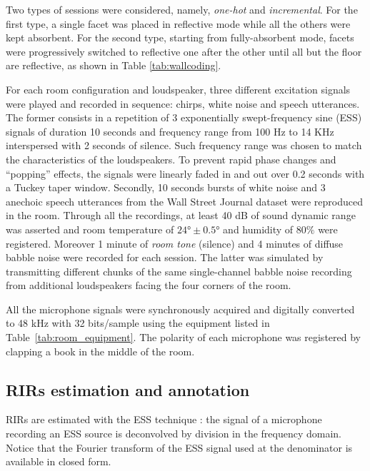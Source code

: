 Two types of sessions were considered, namely, \textit{one-hot} and \textit{incremental}. For the first type, a single facet was placed in reflective mode while all the others were kept absorbent. For the second type, starting from fully-absorbent mode, facets were progressively switched to reflective one after the other until all but the floor are reflective, as shown in Table \ref{tab:wallcoding}.




For each room configuration and loudspeaker, three different excitation signals were played and recorded in sequence: chirps, white noise and speech utterances. The former consists in a repetition of 3 exponentially swept-frequency sine (ESS) signals of duration 10 seconds and frequency range from 100 Hz to 14 KHz interspersed with 2 seconds of silence. Such frequency range was chosen to match the characteristics of the loudspeakers. To prevent rapid phase changes and ``popping'' effects, the signals were linearly faded in and out over 0.2 seconds with a Tuckey taper window.
Secondly, 10 seconds bursts of white noise and 3 anechoic speech utterances from the Wall Street Journal dataset \cite{Paul1992design} were reproduced in the room. Through all the recordings, at least 40 dB of sound dynamic range was asserted and room temperature of $\ang{24} \pm \ang{0.5}$ and humidity of $80\%$ were registered. Moreover 1 minute of \textit{room tone} (silence) and 4 minutes of diffuse babble noise were recorded for each session. The latter was simulated by transmitting different chunks of the same single-channel babble noise recording from additional loudspeakers facing the four corners of the room.

All the microphone signals were synchronously acquired and digitally converted to 48 kHz with 32 bits/sample using the equipment listed in Table~\ref{tab:room_equipment}. The polarity of each microphone was registered by clapping a book in the middle of the room.

\subsection{RIRs estimation and annotation}\label{sec:annotation}
RIRs are estimated with the ESS technique \cite{Farina2007advancements}: the signal of a microphone recording an ESS source is deconvolved by division in the frequency domain. Notice that the Fourier transform of the ESS signal used at the denominator is available in closed form.

